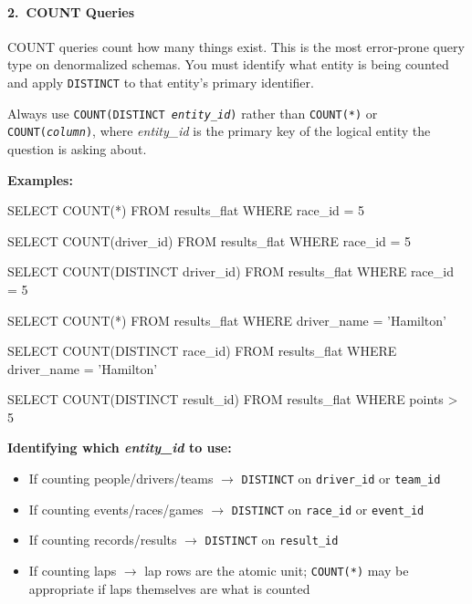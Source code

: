 \begin{tcolorbox}[
  colback=gray!5,
  colframe=gray!20,
  arc=4pt,
  boxrule=0.5pt,
  breakable,
  left=8pt,
  right=8pt,
  top=8pt,
  bottom=8pt,
  nobeforeafter,
]
\tcbline
\paragraph{2.\ COUNT Queries}
COUNT queries count how many things exist.
This is the most error-prone query type on denormalized schemas.
You must identify what entity is being counted and apply \texttt{DISTINCT} to that entity's primary identifier.

\denormrule Always use \texttt{COUNT(DISTINCT \textit{entity\_id})} rather than \texttt{COUNT(*)} or \texttt{COUNT(\textit{column})}, where \textit{entity\_id} is the primary key of the logical entity the question is asking about.

\noindent\textbf{Examples:}

\begin{sqlwrong}
SELECT COUNT(*) FROM results_flat WHERE race_id = 5
\end{sqlwrong}
\begin{sqlwrong}
SELECT COUNT(driver_id) FROM results_flat WHERE race_id = 5
\end{sqlwrong}
\begin{sqlcorrect}
SELECT COUNT(DISTINCT driver_id) FROM results_flat WHERE race_id = 5
\end{sqlcorrect}

\begin{sqlwrong}
SELECT COUNT(*) FROM results_flat WHERE driver_name = 'Hamilton'
\end{sqlwrong}
\begin{sqlcorrect}
SELECT COUNT(DISTINCT race_id) FROM results_flat
  WHERE driver_name = 'Hamilton'
\end{sqlcorrect}

\begin{sqlcorrect}
SELECT COUNT(DISTINCT result_id) FROM results_flat WHERE points > 5
\end{sqlcorrect}

\noindent\textbf{Identifying which \textit{entity\_id} to use:}
\begin{itemize}
  \item If counting people/drivers/teams $\rightarrow$ \texttt{DISTINCT} on \texttt{driver\_id} or \texttt{team\_id}
  \item If counting events/races/games $\rightarrow$ \texttt{DISTINCT} on \texttt{race\_id} or \texttt{event\_id}
  \item If counting records/results $\rightarrow$ \texttt{DISTINCT} on \texttt{result\_id}
  \item If counting laps $\rightarrow$ lap rows are the atomic unit; \texttt{COUNT(*)} may be appropriate if laps themselves are what is counted
\end{itemize}


\end{tcolorbox}
